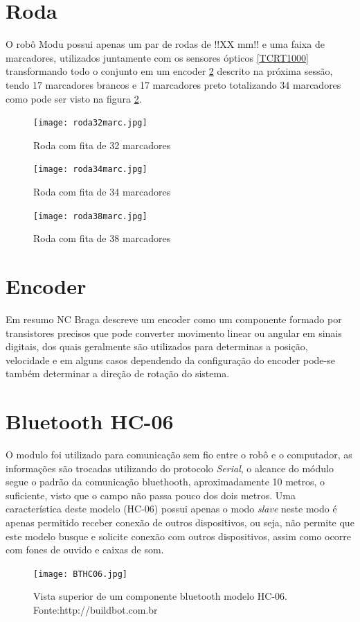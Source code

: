 \documentclass[a4paper,12pt,portuguese]{ufms-cpcx}
\begin{document}
\section{Roda}\label{roda}
O robô Modu possui apenas um par de rodas de !!XX mm!! e uma faixa de marcadores, utilizados juntamente com os sensores ópticos \ref{TCRT1000} transformando todo o conjunto em um encoder \ref{encoder} descrito na próxima sessão, tendo 17 marcadores brancos e 17 marcadores preto totalizando 34 marcadores como pode ser visto na figura \ref{fig:roda34marc}.
\begin{figure}[H]
	\centering
	\texttt{[image: roda32marc.jpg]}
	\caption{Roda com fita de 32 marcadores}
	\label{fig:roda32marc}
\end{figure}
\begin{figure}[H]
	\centering
	\texttt{[image: roda34marc.jpg]}
	\caption{Roda com fita de 34 marcadores}
	\label{fig:roda34marc}
\end{figure}
\begin{figure}[H]
	\centering
	\texttt{[image: roda38marc.jpg]}
	\caption{Roda com fita de 38 marcadores}
	\label{fig:roda38marc}
\end{figure}

\section{Encoder}\label{encoder}
Em resumo NC Braga descreve um encoder como um componente formado por transistores precisos que pode converter movimento linear ou angular em sinais digitais, dos quais geralmente são utilizados para determinas a posição\cite{braga2009funcionam}, velocidade e em alguns casos dependendo da configuração do encoder pode-se também determinar a direção de rotação do sistema. 

\section{Bluetooth HC-06}\label{bthc06}
O modulo foi utilizado para comunicação sem fio entre o robô e o computador, as informações são trocadas utilizando do protocolo \textit{Serial}, o alcance do módulo segue o padrão da comunicação bluethooth, aproximadamente 10 metros, o suficiente, visto que o campo não passa pouco dos dois metros. Uma característica deste modelo (HC-06) possui apenas o modo \textit{slave} neste modo é apenas permitido receber conexão de outros dispositivos, ou seja, não permite que este modelo busque e solicite conexão com outros dispositivos, assim como ocorre com fones de ouvido e caixas de som.
\begin{figure}[H]	
	\centering
	\texttt{[image: BTHC06.jpg]}
	\caption{Vista superior de um componente bluetooth modelo HC-06. Fonte:http://buildbot.com.br}
\end{figure}
\end{document}
